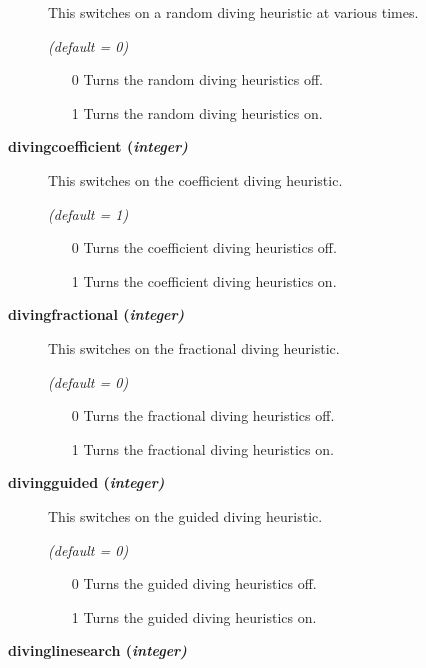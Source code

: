 \begin{description}
This switches on a random diving heuristic at various times.

\textsl{(default = 0)}
\begin{itemize}
\item[0]
Turns the random diving heuristics off.
\item[1]
Turns the random diving heuristics on.
\end{itemize}

\item[\label{divingcoefficient}\hypertarget{divingcoefficient}
{\textbf{divingcoefficient (\slshape{integer})}}]\hspace{1.0in}

This switches on the coefficient diving heuristic.

\textsl{(default = 1)}
\begin{itemize}
\item[0]
Turns the coefficient diving heuristics off.
\item[1]
Turns the coefficient diving heuristics on.
\end{itemize}

\item[\label{divingfractional}\hypertarget{divingfractional}
{\textbf{divingfractional (\slshape{integer})}}]\hspace{1.0in}

This switches on the fractional diving heuristic.

\textsl{(default = 0)}
\begin{itemize}
\item[0]
Turns the fractional diving heuristics off.
\item[1]
Turns the fractional diving heuristics on.
\end{itemize}

\item[\label{divingguided}\hypertarget{divingguided}
{\textbf{divingguided (\slshape{integer})}}]\hspace{1.0in}

This switches on the guided diving heuristic.

\textsl{(default = 0)}
\begin{itemize}
\item[0]
Turns the guided diving heuristics off.
\item[1]
Turns the guided diving heuristics on.
\end{itemize}

\item[\label{divinglinesearch}\hypertarget{divinglinesearch}
{\textbf{divinglinesearch (\slshape{integer})}}]\hspace{1.0in}


\end{description}
